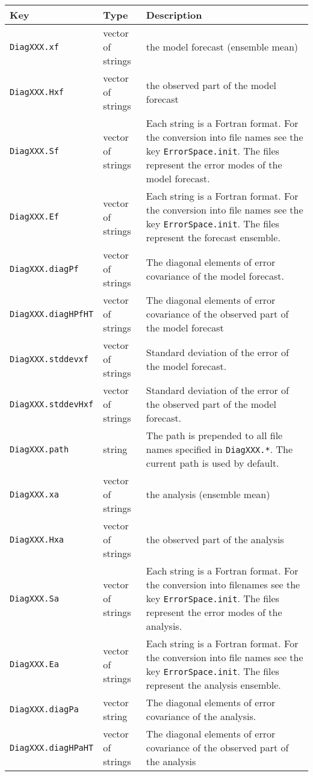 \documentclass[a4paper,12pt]{article}
\newcommand{\code}{\texttt}
\newenvironment{keytabular}{\begin{tabular}{|p{0.3\textwidth}|p{0.2\textwidth}|p{0.5\textwidth}|} \hline Key & Type & Description \\ \hline \hline }{\end{tabular}}
\begin{document}
\begin{keytabular}
\code{DiagXXX.xf} & vector of strings & the model forecast (ensemble mean)
\\
\code{DiagXXX.Hxf} & vector of strings & the observed part of the model forecast
\\
\code{DiagXXX.Sf} & vector of strings & Each string is a Fortran
format. For the conversion into file names see the key
\code{ErrorSpace.init}. The files represent
the error modes of the model forecast.
\\
\code{DiagXXX.Ef} & vector of strings & Each string is a Fortran
format. For the conversion into file names see the key
\code{ErrorSpace.init}. The files represent
the forecast ensemble.
\\
\code{DiagXXX.diagPf} & vector of strings & The diagonal elements of error
covariance of the model forecast.
\\
\code{DiagXXX.diagHPfHT} & vector of strings & The diagonal elements of error
covariance of the observed part of the model forecast 
\\
\code{DiagXXX.stddevxf} & vector of strings & Standard deviation of
the error of the model forecast.
\\
\code{DiagXXX.stddevHxf} & vector of strings & Standard deviation of
the error of the observed part of the model forecast.
\\
\code{DiagXXX.path} & string & The path is prepended to all file names
specified in \code{DiagXXX.*}. The current path is used by default.
\\
\hline
\code{DiagXXX.xa} & vector of strings & the analysis (ensemble mean)
\\
\code{DiagXXX.Hxa} & vector of strings & the observed part of the analysis
\\
\code{DiagXXX.Sa} & vector of strings & Each string is a Fortran
format. For the conversion into filenames see the key
\code{ErrorSpace.init}. The files represent
the error modes of the analysis.
\\
\code{DiagXXX.Ea} & vector of strings & Each string is a Fortran
format. For the conversion into file names see the key
\code{ErrorSpace.init}. The files represent
the analysis ensemble.
\\
\code{DiagXXX.diagPa} & vector string & The diagonal elements of error
covariance of the analysis.
\\
\code{DiagXXX.diagHPaHT} & vector of strings & The diagonal elements of error
covariance of the observed part of the analysis 
\\

\end{keytabular}
\end{document}
